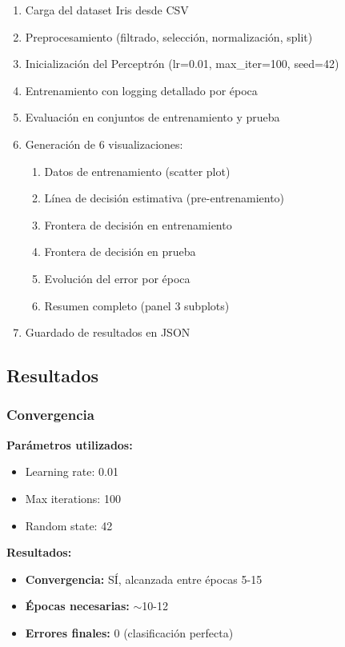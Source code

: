 \documentclass[12pt]{src/formato_utem}
\begin{document}
\begin{enumerate}
    \item Carga del dataset Iris desde CSV
    \item Preprocesamiento (filtrado, selección, normalización, split)
    \item Inicialización del Perceptrón (lr=0.01, max\_iter=100, seed=42)
    \item Entrenamiento con logging detallado por época
    \item Evaluación en conjuntos de entrenamiento y prueba
    \item Generación de 6 visualizaciones:
    \begin{enumerate}
        \item Datos de entrenamiento (scatter plot)
        \item Línea de decisión estimativa (pre-entrenamiento)
        \item Frontera de decisión en entrenamiento
        \item Frontera de decisión en prueba
        \item Evolución del error por época
        \item Resumen completo (panel 3 subplots)
    \end{enumerate}
    \item Guardado de resultados en JSON
\end{enumerate}

\subsection{Resultados}

\subsubsection{Convergencia}

\textbf{Parámetros utilizados:}
\begin{itemize}
    \item Learning rate: 0.01
    \item Max iterations: 100
    \item Random state: 42
\end{itemize}

\textbf{Resultados:}
\begin{itemize}
    \item \textbf{Convergencia:} SÍ, alcanzada entre épocas 5-15
    \item \textbf{Épocas necesarias:} $\sim$10-12
    \item \textbf{Errores finales:} 0 (clasificación perfecta)
\end{itemize}
\end{document}
